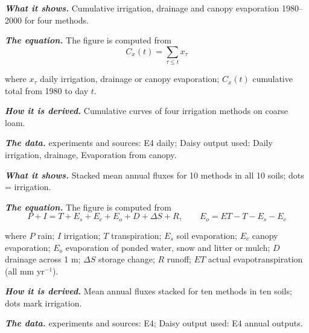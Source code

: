 \label{fig:a19_17}
\par\noindent\textbf{\color{khmag}\emph{What it shows.}} Cumulative irrigation, drainage and canopy evaporation 1980--2000 for four methods.
\par\noindent\textbf{\color{khmag}\emph{The equation.}} The figure is computed from
\begin{equation}\boxed{C_x(t)=\sum_{\tau\le t} x_\tau}\end{equation}
\par\noindent where $x_\tau$ daily irrigation, drainage or canopy evaporation; $C_x(t)$ cumulative total from 1980 to day $t$.
\par\noindent\textbf{\color{khmag}\emph{How it is derived.}} Cumulative curves of four irrigation methods on coarse loam.
\par\noindent\textbf{\color{khmag}\emph{The data.}} experiments and sources: E4 daily; Daisy output used: Daily irrigation, drainage, Evaporation from canopy.
\par\vspace{6pt}\noindent{}\par\nobreak
{}\label{fig:a19_18}
\par\noindent\textbf{\color{khmag}\emph{What it shows.}} Stacked mean annual fluxes for 10 methods in all 10 soils; dots = irrigation.
\par\noindent\textbf{\color{khmag}\emph{The equation.}} The figure is computed from
\begin{equation}\boxed{P+I=T+E_s+E_c+E_o+D+\Delta S+R,\qquad E_o=ET-T-E_s-E_c}\end{equation}
\par\noindent where $P$ rain; $I$ irrigation; $T$ transpiration; $E_s$ soil evaporation; $E_c$ canopy evaporation; $E_o$ evaporation of ponded water, snow and litter or mulch; $D$ drainage across 1 m; $\Delta S$ storage change; $R$ runoff; $ET$ actual evapotranspiration (all mm yr$^{-1}$).
\par\noindent\textbf{\color{khmag}\emph{How it is derived.}} Mean annual fluxes stacked for ten methods in ten soils; dots mark irrigation.
\par\noindent\textbf{\color{khmag}\emph{The data.}} experiments and sources: E4; Daisy output used: E4 annual outputs.
\par\vspace{6pt}\noindent{}\par\nobreak
